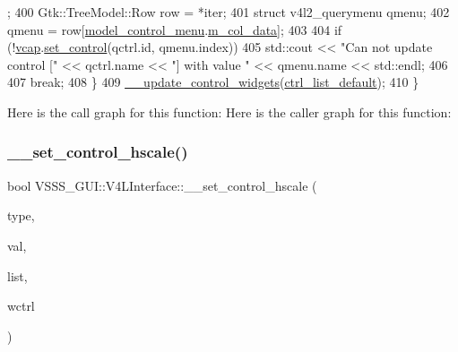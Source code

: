 \begin{DoxyCode}
      ;
400                 Gtk::TreeModel::Row row = *iter;
401                 \textcolor{keyword}{struct }v4l2\_querymenu qmenu;
402                 qmenu = row[\hyperlink{class_v_s_s_s___g_u_i_1_1_v4_l_interface_ac98e20c4b2875e7137f867b3da753640}{model\_control\_menu}.\hyperlink{class_v_s_s_s___g_u_i_1_1_v4_l_interface_1_1_model_column_aa6720e1b3e47adb85d36c3ec3a2bb262}{m\_col\_data}];
403 
404                 \textcolor{keywordflow}{if} (!\hyperlink{class_v_s_s_s___g_u_i_1_1_v4_l_interface_a7ece61f4ccc6d5321c445e60f34e7f33}{vcap}.\hyperlink{classv4lcap_a863a15d2d66cc0b7367dcc9cba64e0bd}{set\_control}(qctrl.id, qmenu.index))
405                     std::cout << \textcolor{stringliteral}{"Can not update control ["} << qctrl.name << \textcolor{stringliteral}{"] with value "} << qmenu.name 
      << std::endl;
406 
407                 \textcolor{keywordflow}{break};
408         \}
409         \hyperlink{class_v_s_s_s___g_u_i_1_1_v4_l_interface_afbb5daccfdce20180578025c108ef65b}{\_\_update\_control\_widgets}(\hyperlink{class_v_s_s_s___g_u_i_1_1_v4_l_interface_a97faf21f7b67c8ef15ceeafa377c6ea4}{ctrl\_list\_default});
410     \}
\end{DoxyCode}
Here is the call graph for this function\+:
Here is the caller graph for this function\+:
\mbox{\label{class_v_s_s_s___g_u_i_1_1_v4_l_interface_aa14a838434102fd12d5d0ffbc242e753}} 
\subsubsection{\texorpdfstring{\+\_\+\+\_\+set\+\_\+control\+\_\+hscale()}{\_\_set\_control\_hscale()}}
{\footnotesize\ttfamily bool V\+S\+S\+S\+\_\+\+G\+U\+I\+::\+V4\+L\+Interface\+::\+\_\+\+\_\+set\+\_\+control\+\_\+hscale (\begin{DoxyParamCaption}\item[{int}]{type,  }\item[{double}]{val,  }\item[{std\+::list$<$ \hyperlink{namespace_v_s_s_s___g_u_i_a9eff2f5504f050458ee4bcf362482a8d}{Control\+Holder} $>$ $\ast$}]{list,  }\item[{Gtk\+::\+Widget $\ast$}]{wctrl }\end{DoxyParamCaption})\hspace{0.3cm}{\ttfamily [private]}}



